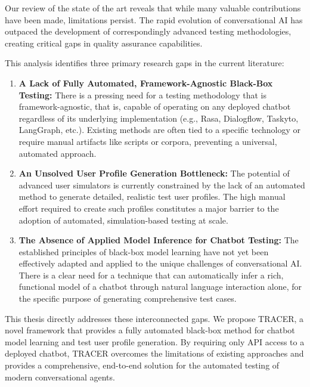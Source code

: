 Our review of the state of the art
reveals that while many valuable contributions have been made,
limitations persist.
The rapid evolution of conversational AI
has outpaced the development of
correspondingly advanced testing methodologies,
creating critical gaps in quality assurance capabilities.

This analysis identifies three primary research gaps in the current literature:
\begin{enumerate}
    \item \textbf{A Lack of Fully Automated, Framework-Agnostic Black-Box Testing:}
      There is a pressing need for a testing methodology
      that is framework-agnostic, that is,
      capable of operating on any deployed chatbot
      regardless of its underlying implementation
      (e.g., Rasa, Dialogflow, Taskyto, LangGraph, etc.).
      Existing methods are often tied to a specific technology
      or require manual artifacts like scripts or corpora,
      preventing a universal, automated approach.

    \item \textbf{An Unsolved User Profile Generation Bottleneck:}
      The potential of advanced user simulators
      is currently constrained by the lack of an automated method
      to generate detailed, realistic test user profiles.
      The high manual effort required to create such profiles
      constitutes a major barrier
      to the adoption of automated, simulation-based testing at scale.

    \item \textbf{The Absence of Applied Model Inference for Chatbot Testing:}
      The established principles of black-box model learning
      have not yet been effectively adapted and applied
      to the unique challenges of conversational \ac{AI}.
      There is a clear need for a technique
      that can automatically infer a rich, functional model of a chatbot
      through natural language interaction alone,
      for the specific purpose of generating comprehensive test cases.

\end{enumerate}

This thesis directly addresses these interconnected gaps.
We propose \ac{TRACER}, a novel framework
that provides a fully automated black-box method
for chatbot model learning and test user profile generation.
By requiring only \ac{API} access to a deployed chatbot,
\ac{TRACER} overcomes the limitations of existing approaches
and provides a comprehensive, end-to-end solution
for the automated testing of modern conversational agents.
